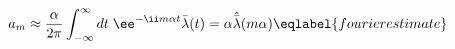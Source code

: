 \begin{equation}
a_m \approx \frac {\alpha}{2\pi}\int_{-\infty}^{\infty} dt\;
\ee^{-\ii m\alpha t} \bar\lambda(t) = 
\alpha\hat{\bar\lambda}(m \alpha)
\eqlabel{fourierestimate}
\end{equation}

